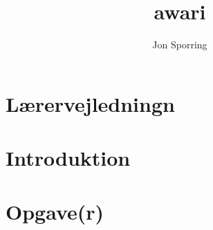 \documentclass[a4paper,12pt]{article}
\title{awari}
\author{Jon Sporring}
\begin{document}
\maketitle

\section{Lærervejledningn}

\section{Introduktion}

\section{Opgave(r)}

\end{document}
